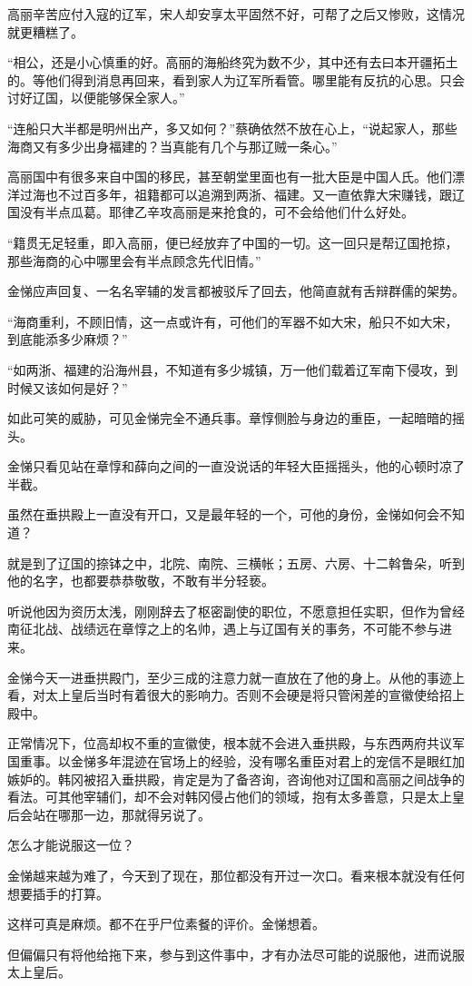 高丽辛苦应付入寇的辽军，宋人却安享太平固然不好，可帮了之后又惨败，这情况就更糟糕了。

“相公，还是小心慎重的好。高丽的海船终究为数不少，其中还有去曰本开疆拓土的。等他们得到消息再回来，看到家人为辽军所看管。哪里能有反抗的心思。只会讨好辽国，以便能够保全家人。”

“连船只大半都是明州出产，多又如何？”蔡确依然不放在心上，“说起家人，那些海商又有多少出身福建的？当真能有几个与那辽贼一条心。”

高丽国中有很多来自中国的移民，甚至朝堂里面也有一批大臣是中国人氏。他们漂洋过海也不过百多年，祖籍都可以追溯到两浙、福建。又一直依靠大宋赚钱，跟辽国没有半点瓜葛。耶律乙辛攻高丽是来抢食的，可不会给他们什么好处。

“籍贯无足轻重，即入高丽，便已经放弃了中国的一切。这一回只是帮辽国抢掠，那些海商的心中哪里会有半点顾念先代旧情。”

金悌应声回复、一名名宰辅的发言都被驳斥了回去，他简直就有舌辩群儒的架势。

“海商重利，不顾旧情，这一点或许有，可他们的军器不如大宋，船只不如大宋，到底能添多少麻烦？”

“如两浙、福建的沿海州县，不知道有多少城镇，万一他们载着辽军南下侵攻，到时候又该如何是好？”

如此可笑的威胁，可见金悌完全不通兵事。章惇侧脸与身边的重臣，一起暗暗的摇头。

金悌只看见站在章惇和薛向之间的一直没说话的年轻大臣摇摇头，他的心顿时凉了半截。

虽然在垂拱殿上一直没有开口，又是最年轻的一个，可他的身份，金悌如何会不知道？

就是到了辽国的捺钵之中，北院、南院、三横帐；五房、六房、十二斡鲁朵，听到他的名字，也都要恭恭敬敬，不敢有半分轻亵。

听说他因为资历太浅，刚刚辞去了枢密副使的职位，不愿意担任实职，但作为曾经南征北战、战绩远在章惇之上的名帅，遇上与辽国有关的事务，不可能不参与进来。

金悌今天一进垂拱殿门，至少三成的注意力就一直放在了他的身上。从他的事迹上看，对太上皇后当时有着很大的影响力。否则不会硬是将只管闲差的宣徽使给招上殿中。

正常情况下，位高却权不重的宣徽使，根本就不会进入垂拱殿，与东西两府共议军国重事。以金悌多年混迹在官场上的经验，没有哪名重臣对君上的宠信不是眼红加嫉妒的。韩冈被招入垂拱殿，肯定是为了备咨询，咨询他对辽国和高丽之间战争的看法。可其他宰辅们，却不会对韩冈侵占他们的领域，抱有太多善意，只是太上皇后会站在哪那一边，那就得另说了。

怎么才能说服这一位？

金悌越来越为难了，今天到了现在，那位都没有开过一次口。看来根本就没有任何想要插手的打算。

这样可真是麻烦。都不在乎尸位素餐的评价。金悌想着。

但偏偏只有将他给拖下来，参与到这件事中，才有办法尽可能的说服他，进而说服太上皇后。

